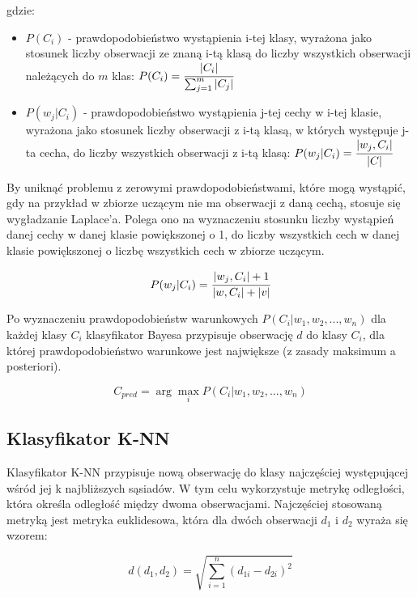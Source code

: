 \documentclass{article}
\begin{document}
gdzie:
\begin{itemize}
    \item $P(C_i)$ - prawdopodobieństwo wystąpienia i-tej klasy, wyrażona jako 
    stosunek liczby obserwacji ze znaną i-tą klasą do liczby wszystkich obserwacji
    należących do $m$ klas:
    $P(C_i) = \cfrac{|C_i|}{\sum_{j=1}^{m}|C_j|}$
    \item $P(w_j|C_i)$ - prawdopodobieństwo wystąpienia j-tej cechy w i-tej klasie,
    wyrażona jako stosunek liczby obserwacji z i-tą klasą, w których występuje j-ta cecha,
    do liczby wszystkich obserwacji z i-tą klasą:
    $P(w_j|C_i) = \cfrac{|w_j, C_i|}{|C|}$
\end{itemize}

\newpage

By uniknąć problemu z zerowymi prawdopodobieństwami,
które mogą wystąpić, gdy na przykład w zbiorze uczącym nie ma obserwacji
z daną cechą, stosuje się wygładzanie Laplace'a. Polega ono
na wyznaczeniu stosunku liczby wystąpień danej cechy w danej klasie
powiększonej o 1, do liczby wszystkich cech w danej klasie powiększonej
o liczbę wszystkich cech w zbiorze uczącym.

\begin{equation}
    P(w_j|C_i) = \cfrac{|w_j, C_i| + 1}{|w, C_i| + |v|}
\end{equation}

Po wyznaczeniu prawdopodobieństw warunkowych $P(C_i|w_1, w_2, ..., w_n)$ dla każdej klasy
$C_i$ klasyfikator Bayesa przypisuje obserwację $d$ do klasy $C_i$, dla której prawdopodobieństwo
warunkowe jest największe (z zasady maksimum a posteriori).

\begin{equation}
    C_{pred} = \arg\max_{i}P(C_i|w_1, w_2, ..., w_n)
\end{equation}

\subsection{Klasyfikator K-NN}

Klasyfikator K-NN przypisuje nową obserwację do klasy najczęściej
występującej wśród jej k najbliższych sąsiadów. W tym celu wykorzystuje
metrykę odległości, która określa odległość między dwoma obserwacjami.
Najczęściej stosowaną metryką jest metryka euklidesowa, która dla dwóch
obserwacji $d_1$ i $d_2$ wyraża się wzorem:

\begin{equation}
    d(d_1, d_2) = \sqrt{\sum_{i=1}^{n}(d_{1i} - d_{2i})^2}
\end{equation}
\end{document}
